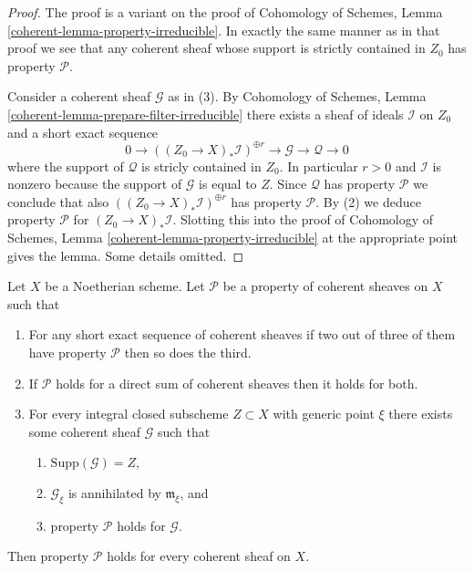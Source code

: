 \begin{proof}
The proof is a variant on the proof of
Cohomology of Schemes, Lemma \ref{coherent-lemma-property-irreducible}.
In exactly the same manner as in that proof we see that
any coherent sheaf whose support is strictly contained in $Z_0$
has property $\mathcal{P}$.

\medskip\noindent
Consider a coherent sheaf $\mathcal{G}$ as in (3).
By Cohomology of Schemes, Lemma \ref{coherent-lemma-prepare-filter-irreducible}
there exists a sheaf of ideals $\mathcal{I}$ on $Z_0$ and
a short exact sequence
$$
0 \to
\left((Z_0 \to X)_*\mathcal{I}\right)^{\oplus r} \to
\mathcal{G} \to
\mathcal{Q} \to 0
$$
where the support of $\mathcal{Q}$ is stricly contained in $Z_0$.
In particular $r > 0$ and $\mathcal{I}$ is nonzero
because the support of $\mathcal{G}$ is equal to $Z$.
Since $\mathcal{Q}$ has property $\mathcal{P}$ we conclude that
also $\left((Z_0 \to X)_*\mathcal{I}\right)^{\oplus r}$
has property $\mathcal{P}$.
By (2) we deduce property $\mathcal{P}$ for
$(Z_0 \to X)_*\mathcal{I}$. Slotting this into the proof of
Cohomology of Schemes, Lemma \ref{coherent-lemma-property-irreducible}
at the appropriate point gives the lemma.
Some details omitted.
\end{proof}

\begin{lemma}
\label{lemma-property-higher-rank}
Let $X$ be a Noetherian scheme.
Let $\mathcal{P}$ be a property of coherent sheaves on $X$ such that
\begin{enumerate}
\item For any short exact sequence of coherent sheaves if two
out of three of them have property $\mathcal{P}$ then so does the
third.
\item If $\mathcal{P}$ holds for a direct sum of coherent sheaves
then it holds for both.
\item For every integral closed subscheme $Z \subset X$
with generic point $\xi$ there exists
some coherent sheaf $\mathcal{G}$ such that
\begin{enumerate}
\item $\text{Supp}(\mathcal{G}) = Z$,
\item $\mathcal{G}_\xi$ is annihilated by $\mathfrak m_\xi$, and
\item property $\mathcal{P}$ holds for $\mathcal{G}$.
\end{enumerate}
\end{enumerate}
Then property $\mathcal{P}$ holds for every coherent sheaf
on $X$.
\end{lemma}

